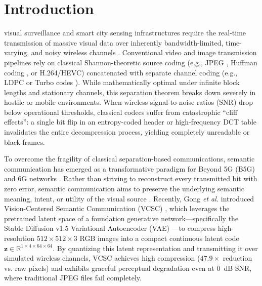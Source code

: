 \documentclass[journal,twocolumn]{IEEEtran}
\begin{document}
\section{Introduction}
 visual surveillance and smart city sensing infrastructures require the real-time transmission of massive visual data over inherently bandwidth-limited, time-varying, and noisy wireless channels \cite{gong2026wireless, kang2022task}. Conventional video and image transmission pipelines rely on classical Shannon-theoretic source coding (e.g., JPEG \cite{wallace1992jpeg}, Huffman coding \cite{huffman1952method}, or H.264/HEVC) concatenated with separate channel coding (e.g., LDPC or Turbo codes \cite{berrou1993near}). While mathematically optimal under infinite block lengths and stationary channels, this separation theorem breaks down severely in hostile or mobile environments. When wireless signal-to-noise ratios (SNR) drop below operational thresholds, classical codecs suffer from catastrophic ``cliff effects'': a single bit flip in an entropy-coded header or high-frequency DCT table invalidates the entire decompression process, yielding completely unreadable or black frames.

To overcome the fragility of classical separation-based communications, semantic communication has emerged as a transformative paradigm for Beyond 5G (B5G) and 6G networks \cite{qin2022semantic, xie2021deep, zhang2022task}. Rather than striving to reconstruct every transmitted bit with zero error, semantic communication aims to preserve the underlying semantic meaning, intent, or utility of the visual source \cite{bourtsoulatze2019deep, dai2022nonlinear}. Recently, Gong \textit{et al.} introduced Vision-Centered Semantic Communication (VCSC) \cite{gong2026wireless}, which leverages the pretrained latent space of a foundation generative network---specifically the Stable Diffusion v1.5 Variational Autoencoder (VAE) \cite{rombach2022high}---to compress high-resolution $512 \times 512 \times 3$ RGB images into a compact continuous latent code $\mathbf{z} \in \mathbb{R}^{1 \times 4 \times 64 \times 64}$. By quantizing this latent representation and transmitting it over simulated wireless channels, VCSC achieves high compression ($47.9\times$ reduction vs. raw pixels) and exhibits graceful perceptual degradation even at 0~dB SNR, where traditional JPEG files fail completely.
\end{document}
